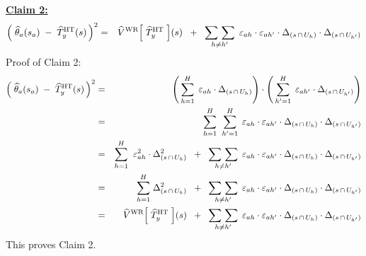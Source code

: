 \begin{enumerate}
	\vskip 0.8cm
	\noindent
	\underline{\textbf{Claim 2:}}
	\begin{eqnarray*}
	\left(\;\widehat{\theta}_{a}(s_{a}) \;-\; \widehat{T}^{\textnormal{HT}}_{y}(s)\,\right)^{2}
	& = &
		\widehat{V}^{\textnormal{WR}}\!\left[\;\widehat{T}^{\textnormal{HT}}_{y}\;\right]\!(s)
		\;\; + \;\;
		\underset{h \neq h^{\prime}}{\sum\,\sum}\;\,
			\varepsilon_{ah} \cdot \varepsilon_{ah^{\prime}} 
			\cdot \Delta_{(s\,\cap\,U_{h})}
			\cdot \Delta_{(s\,\cap\,U_{h^{\prime}})}
	\end{eqnarray*}
	Proof of Claim 2:
	\begin{eqnarray*}
	\left(\;\widehat{\theta}_{a}(s_{a}) \;-\; \widehat{T}^{\textnormal{HT}}_{y}(s)\,\right)^{2}
	& = &
		\left(\,\overset{H}{\underset{h=1}{\sum}}\;\,
			\varepsilon_{ah} \cdot \Delta_{(s\,\cap\,U_{h})}\right)
		\cdot
		\left(\,\overset{H}{\underset{h^{\prime}=1}{\sum}}\;\,
			\varepsilon_{ah^{\prime}} \cdot \Delta_{(s\,\cap\,U_{h^{\prime}})}\right)
	\\
	& = &
		\overset{H}{\underset{h=1}{\sum}}\;\;
		\overset{H}{\underset{h^{\prime}=1}{\sum}}\;\,
			\varepsilon_{ah} \cdot \varepsilon_{ah^{\prime}} 
			\cdot \Delta_{(s\,\cap\,U_{h})}
			\cdot \Delta_{(s\,\cap\,U_{h^{\prime}})}
	\\
	& = &
		\overset{H}{\underset{h=1}{\sum}}\;\;
			\varepsilon_{ah}^{2} \cdot \Delta_{(s\,\cap\,U_{h})}^{2}
		\;\; + \;\;
		\underset{h \neq h^{\prime}}{\sum\,\sum}\;\,
			\varepsilon_{ah} \cdot \varepsilon_{ah^{\prime}} 
			\cdot \Delta_{(s\,\cap\,U_{h})}
			\cdot \Delta_{(s\,\cap\,U_{h^{\prime}})}
	\\
	& = &
		\overset{H}{\underset{h=1}{\sum}}\; \Delta_{(s\,\cap\,U_{h})}^{2}
		\;\; + \;\;
		\underset{h \neq h^{\prime}}{\sum\,\sum}\;\,
			\varepsilon_{ah} \cdot \varepsilon_{ah^{\prime}} 
			\cdot \Delta_{(s\,\cap\,U_{h})}
			\cdot \Delta_{(s\,\cap\,U_{h^{\prime}})}
	\\
	& = &
		\widehat{V}^{\textnormal{WR}}\!\left[\;\widehat{T}^{\textnormal{HT}}_{y}\;\right]\!(s)
		\;\; + \;\;
		\underset{h \neq h^{\prime}}{\sum\,\sum}\;\,
			\varepsilon_{ah} \cdot \varepsilon_{ah^{\prime}} 
			\cdot \Delta_{(s\,\cap\,U_{h})}
			\cdot \Delta_{(s\,\cap\,U_{h^{\prime}})}
	\end{eqnarray*}
	This proves Claim 2.


\end{enumerate}
